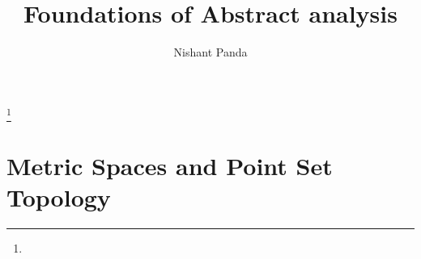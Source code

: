 \documentclass{gsm-l}
\begin{document}
\frontmatter

\title{Foundations of Abstract analysis}

\author{Nishant Panda}
\address{2451 S. Timberline Rd, Apt 4, Fort Collins, Co 80525}
\curraddr{}
\thanks{}



\maketitle
\setcounter{page}{5}
\tableofcontents

%

\mainmatter{}
\part{Metric Spaces and Point Set Topology}
%
%
%
%
%

\appendix


\backmatter{}
%
%

\printindex
\end{document}
